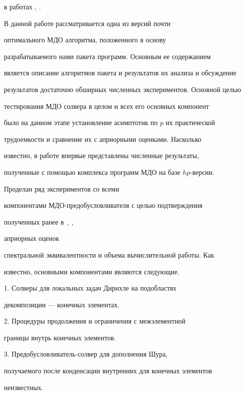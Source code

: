 в работах \cite{Korneev:02b}, \cite{KXA2002}.





В данной работе рассматривается одна из версий почти


оптимального МДО алгоритма, положенного в основу


разрабатываемого нами пакета программ. Основным ее содержанием


является описание алгоритмов пакета и результатов их анализа и обсуждение 


результатов достаточно обширных численных экспериментов. Основной целью


тестирования МДО солвера в целом и всех его основных компонент


было на данном этапе установление асимптотик по $p$ их практической


трудоемкости и сравнение их с априорными оценками. Насколько 


известно, в работе впервые представлены численные результаты,


полученные с помощью комплекса программ МДО на базе $hp$-версии.


Проделан ряд экспериментов со всеми


компонентами МДО-предобусловливателя с целью подтверждения


полученных ранее в~\cite{KJ1999}, \cite{KJ1999a},


\cite{KXA2002} априорных оценок


спектральной эквивалентности и объема вычислительной работы. Как


известно, основными компонентами являются следующие.





1. Солверы для локальных задач Дирихле на подобластях 


декомпозиции --- конечных элементах.





2. Процедуры продолжения и ограничения с межэлементной


границы внутрь конечных элементов.





3. Предобусловливатель-солвер для дополнения Шура,


получаемого после конденсации внутренних для конечных элементов


неизвестных.





